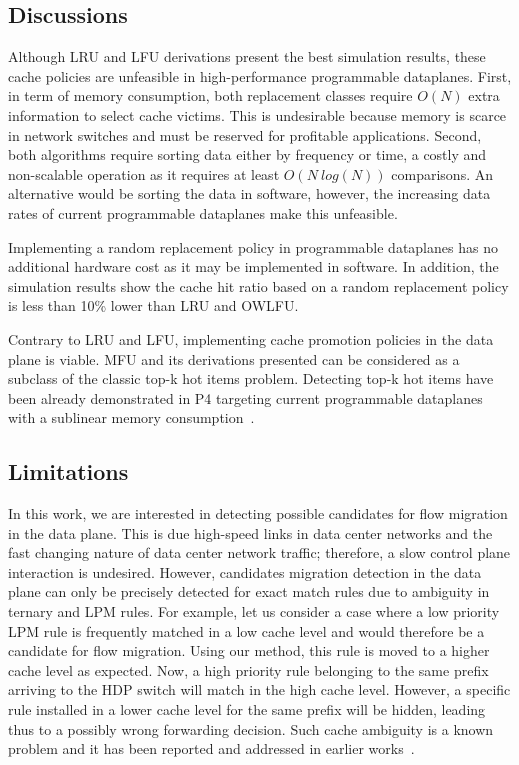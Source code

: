 \subsection{Discussions}

Although LRU and LFU derivations present the best simulation results, these cache policies are unfeasible in high-performance programmable dataplanes.
First, in term of memory consumption, both replacement classes require $O(N)$ extra information to select cache victims.
This is undesirable because memory is scarce in network switches and must be reserved for profitable applications.
Second, both algorithms require sorting data either by frequency or time, a costly and non-scalable operation as it requires at least $O(N~log(N))$ comparisons.
An alternative would be sorting the data in software, however, the increasing data rates of current programmable dataplanes make this unfeasible.  

Implementing a random replacement policy in programmable dataplanes has no additional hardware cost as it may be implemented in software.
In addition, the simulation results show the cache hit ratio based on a random replacement policy is less than 10\% lower than LRU and OWLFU.

Contrary to LRU and LFU, implementing cache promotion policies in the data plane is viable.
MFU and its derivations presented can be considered as a subclass of the classic top-k hot items problem.
Detecting top-k hot items have been already demonstrated in P4 targeting current programmable dataplanes with a sublinear memory consumption~\cite{Sivaraman:17}.

\subsection{Limitations}\label{sec:method:limitations}

In this work, we are interested in detecting possible candidates for flow migration in the data plane.
This is due high-speed links in data center networks and the fast changing nature of data center network traffic; therefore, a slow control plane interaction is undesired.
However, candidates migration detection in the data plane can only be precisely detected for exact match rules due to ambiguity in ternary and LPM rules.
For example, let us consider a case where a low priority LPM rule is frequently matched in a low cache level and would therefore be a candidate for flow migration.
Using our method, this rule is moved to a higher cache level as expected.
Now, a high priority rule belonging to the same prefix arriving to the HDP switch will match in the high cache level.
However, a specific rule installed in a lower cache level for the same prefix will be hidden, leading thus to a possibly wrong forwarding decision.   
Such cache ambiguity is a known problem and it has been reported and addressed in earlier works~\cite{Degermark:1997,Katta:2014}.

